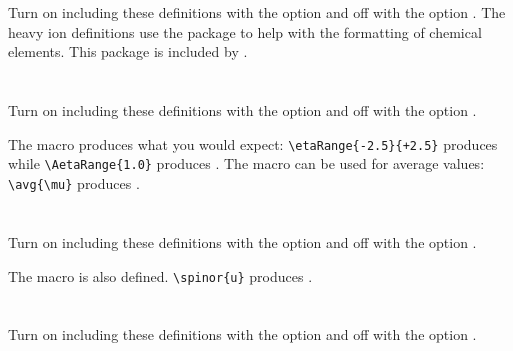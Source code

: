 


\newpage
\section{}

Turn on including these definitions with the option  and off with the option .
The heavy ion definitions use the package  to help with the formatting of chemical elements.
This package is included by .



%


\newpage
\section{}

Turn on including these definitions with the option  and off with the option .



\noindent The macro  produces what you would expect:
\verb|\etaRange{-2.5}{+2.5}| produces  while
\verb|\AetaRange{1.0}| produces .
The macro  can be used for average values:
\verb|\avg{\mu}| produces \avg{\mu}.


\newpage
\section{}

Turn on including these definitions with the option  and off with the option .



\noindent The macro  is also defined.
\verb|\spinor{u}| produces .


\newpage
\section{}

Turn on including these definitions with the option  and off with the option .


